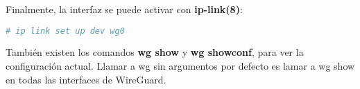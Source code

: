 \begin{frame}[fragile]
  \frametitle{}

  Finalmente, la interfaz se puede activar con  \textbf{ip-link(8)}: 

  \vspace{\baselineskip}
  \begin{lstlisting}[language=Bash]
  # ip link set up dev wg0
  \end{lstlisting}

  \vspace{\baselineskip}
  También existen los comandos \textbf{wg show} y \textbf{wg showconf}, para ver
  la configuración actual. Llamar a wg sin argumentos por defecto es 
  lamar a wg show en todas las interfaces de WireGuard.

\end{frame}


%
%
